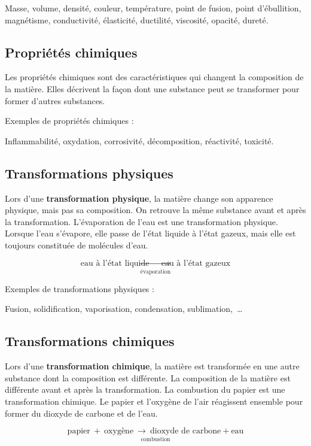 \documentclass[
  11pt,
  a4paper,
  openany]{book}
\begin{document}
Masse, volume, densité, couleur, température, point de fusion, point d'ébullition, magnétisme, conductivité, élasticité, ductilité, viscosité, opacité, dureté.

\subsection{Propriétés chimiques}\label{propriuxe9tuxe9s-chimiques}

Les propriétés chimiques sont des caractéristiques qui changent la composition de la matière. Elles décrivent la façon dont une substance peut se transformer pour former d'autres substances.

Exemples de propriétés chimiques :

Inflammabilité, oxydation, corrosivité, décomposition, réactivité, toxicité.

\subsection{Transformations physiques}\label{transformations-physiques}

Lors d'une \textbf{transformation physique}, la matière change son apparence physique, mais pas sa composition. On retrouve la même substance avant et après la transformation. L'évaporation de l'eau est une transformation physique. Lorsque l'eau s'évapore, elle passe de l'état liquide à l'état gazeux, mais elle est toujours constituée de molécules d'eau.

\[ \underset{\text{évaporation}}{\text{eau à l'état liquide} \ \longrightarrow \ \text{eau à l'état gazeux}} \]

Exemples de transformations physiques :

Fusion, solidification, vaporisation, condensation, sublimation,~\ldots{}

\subsection{Transformations chimiques}\label{transformations-chimiques}

Lors d'une \textbf{transformation chimique}, la matière est transformée en une autre substance dont la composition est différente. La composition de la matière est différente avant et après la transformation. La combustion du papier est une transformation chimique. Le papier et l'oxygène de l'air réagissent ensemble pour former du dioxyde de carbone et de l'eau.

\[ \underset{\text{combustion}}{\text{papier}\ +\ \text{oxygène} \ \longrightarrow \ \text{dioxyde de carbone} + \text{eau}} \]
\end{document}
